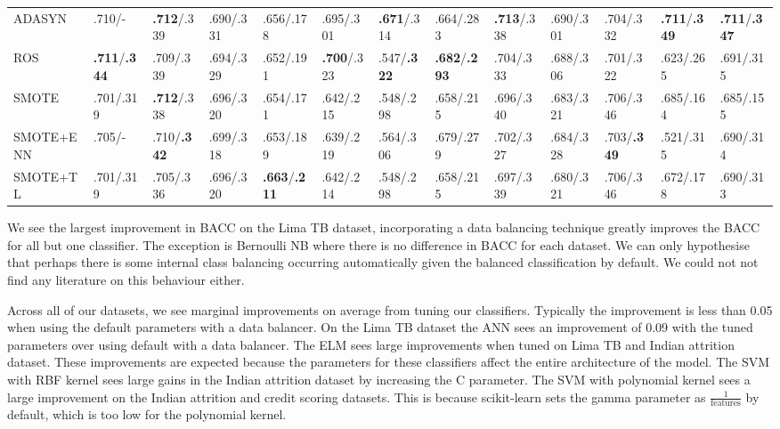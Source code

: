 \documentclass{sig-alternate-05-2015}
\begin{document}
\begin{table}
{\begin{tabular}{l|l|l|l|l|l|l|l|l|l|l|l|l}
				ADASYN&.710/-&\textbf{.712}/.339&.690/.331&.656/.178&.695/.301&\textbf{.671}/.314&.664/.283&\textbf{.713}/.338&.690/.301&.704/.332&\textbf{.711}/\textbf{.349}&\textbf{.711}/\textbf{.347}\\ 
				ROS&\textbf{.711}/\textbf{.344}&.709/.339&.694/.329&.652/.191&\textbf{.700}/.323&.547/\textbf{.322}&\textbf{.682}/\textbf{.293}&.704/.333&.688/.306&.701/.322&.623/.265&.691/.315\\
				SMOTE&.701/.319&\textbf{.712}/.338&.696/.320&.654/.171&.642/.215&.548/.298&.658/.215&.696/.340&.683/.321&.706/.346&.685/.164&.685/.155\\ 
				SMOTE+ENN&.705/-&.710/\textbf{.342}&.699/.318&.653/.189&.639/.219&.564/.306&.679/.279&.702/.327&.684/.328&.703/\textbf{.349}&.521/.315&.690/.314\\ 
				SMOTE+TL&.701/.319&.705/.336&.696/.320&\textbf{.663}/\textbf{.211}&.642/.214&.548/.298&.658/.215&.697/.339&.680/.321&.706/.346&.672/.178&.690/.313\\
				\hline				
		\end{tabular}}
		\vspace{-1em}
	\end{table}	
	
	We see the largest improvement in BACC on the Lima TB dataset, incorporating a data balancing technique greatly improves the BACC for all but one classifier. The exception is Bernoulli NB where there is no difference in BACC for each dataset. We can only hypothesise that perhaps there is some internal class balancing occurring automatically given the balanced classification by default. We could not not find any literature on this behaviour either.
	
	Across all of our datasets, we see marginal improvements on average from tuning our classifiers. Typically the improvement is less than 0.05 when using the default parameters with a data balancer. On the Lima TB dataset the ANN sees an improvement of 0.09 with the tuned parameters over using default with a data balancer. The ELM sees large improvements when tuned on Lima TB and Indian attrition dataset. These improvements are expected because the parameters for these classifiers affect the entire architecture of the model. The SVM with RBF kernel sees large gains in the Indian attrition dataset by increasing the C parameter. The SVM with polynomial kernel sees a large improvement on the Indian attrition and credit scoring datasets. This is because scikit-learn sets the gamma parameter as $\frac{1}{\text{features}}$ by default, which is too low for the polynomial kernel.
	
\end{document}
